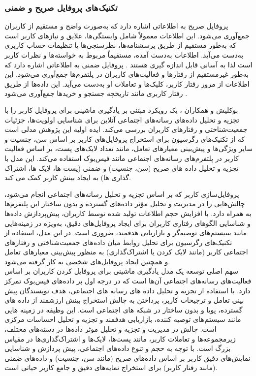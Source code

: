 \subsubsection{تکنیک های پروفایل صریح و ضمنی}
پروفایل صریح به اطلاعاتی اشاره دارد که به‌صورت واضح و مستقیم از کاربران جمع‌آوری می‌شود. این اطلاعات معمولاً شامل وابستگی‌ها، علایق و نیازهای کاربر است که به‌طور مستقیم از طریق پرسشنامه‌ها، نظرسنجی‌ها یا تنظیمات حساب کاربری به‌دست می‌آید. اطلاعات به‌‌دست آمده، مستقیماً مربوط به خواسته‌ها و نظرات کاربر است لذا به آسانی قابل اندازه گیری هستند %
\cite{jabeenuser}
.
\newline
پروفایل ضمنی به اطلاعاتی اشاره دارد که به‌طور غیرمستقیم از رفتارها و فعالیت‌های کاربران در پلتفرم‌ها جمع‌آوری می‌شود. این اطلاعات از مرور رفتار کاربر، کلیک‌ها و تعاملات او به‌دست می‌آید. این داده‌ها از طریق رفتار کاربری مانند تاریخچه جستجو و خریدها جمع‌آوری می‌شود %
\cite{jabeenuser}
. 
\newline

بوکلیش و همکاران %
\cite{azzam2022model}
 ،
 یک رویکرد مبتنی بر یادگیری ماشینی برای پروفایل کاربر را با تجزیه و تحلیل داده‌های رسانه‌های اجتماعی آنلاین برای شناسایی اولویت‌ها، جزئیات جمعیت‌شناختی و رفتارهای کاربران بررسی می‌کند. ایده اولیه این پژوهش مدلی است که از تکنیک‌های رگرسیون برای استخراج پروفایل‌های کاربر بر اساس سن، جنسیت و سایر ویژگی‌ها و پیش‌بینی معیارهای تعامل، مانند تعداد لایک‌های پست، بر اساس فعالیت کاربر در پلتفرم‌های رسانه‌های اجتماعی مانند فیس‌بوک استفاده می‌کند. این مدل با تجزیه و تحلیل داده های صریح (سن، جنسیت) و ضمنی (پست ها، لایک ها، اشتراک گذاری ها) به ایجاد بینش کاربر کمک می کند.

پروفایل‌سازی کاربر که بر اساس تجزیه و تحلیل رسانه‌های اجتماعی انجام می‌شود، چالش‌هایی را در مدیریت و تحلیل مؤثر داده‌های گسترده و بدون ساختار این پلتفرم‌ها به همراه دارد. با افزایش حجم اطلاعات تولید شده توسط کاربران، پیش‌پردازش داده‌ها و شناسایی الگوهای رفتاری کاربران برای ایجاد پروفایل‌های دقیق، به‌ویژه در زمینه‌هایی مانند سیستم‌های توصیه‌گر و بازاریابی هدفمند، ضروری است. در این مدل، استفاده از تکنیک‌های رگرسیون برای تحلیل روابط میان داده‌های جمعیت‌شناختی و رفتارهای اجتماعی کاربر (مانند لایک کردن یا اشتراک‌گذاری) به منظور پیش‌بینی معیارهای تعامل و همچنین ایجاد پروفایل‌های شخصی به کار گرفته می‌شود.\\


سهم اصلی 
\cite{azzam2022model}
 توسعه یک مدل یادگیری ماشینی برای پروفایل کردن کاربران بر اساس فعالیت‌های رسانه‌های اجتماعی آن‌ها است که در درجه اول بر داده‌های فیس‌بوک تمرکز دارد. با استفاده از تجزیه و تحلیل داده های رسانه های اجتماعی، هدف نویسندگان پیش بینی تعامل و ترجیحات کاربر، پرداختن به چالش استخراج بینش ارزشمند از داده های گسترده، پویا و بدون ساختار در شبکه های اجتماعی است. این وظیفه در زمینه هایی مانند سیستم های توصیه کننده، بازاریابی هدفمند و تجزیه و تحلیل احساسات مرکزی است.
چالش در مدیریت و تجزیه و تحلیل موثر داده‌ها در دسته‌های مختلف، زیرمجموعه‌ها و تعاملات کاربر، مانند پست‌ها، لایک‌ها و اشتراک‌گذاری‌ها در مقیاس بزرگ است. با توجه به حجم و تنوع داده‌های اجتماعی، پیش پردازش و شناسایی نمایش‌های دقیق کاربر بر اساس داده‌های صریح (مانند سن، جنسیت) و داده‌های ضمنی (مانند رفتار کاربر) برای استخراج نمایه‌های دقیق و جامع کاربر حیاتی است.

